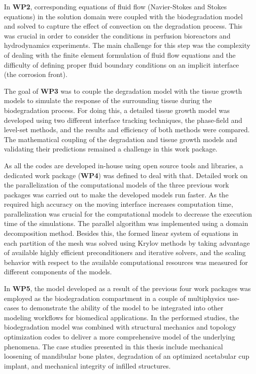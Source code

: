 In \textbf{WP2}, corresponding equations of fluid flow (Navier-Stokes and Stokes equations) in the solution domain were coupled with the biodegradation model and solved to capture the effect of convection on the degradation process. This was crucial in order to consider the conditions in perfusion bioreactors and hydrodynamics experiments. The main challenge for this step was the complexity of dealing with the finite element formulation of fluid flow equations and the difficulty of defining proper fluid boundary conditions on an implicit interface (the corrosion front).

The goal of \textbf{WP3} was to couple the degradation model with the tissue growth models to simulate the response of the surrounding tissue during the biodegradation process. For doing this, a detailed tissue growth model was developed using two different interface tracking techniques, the phase-field and level-set methods, and the results and efficiency of both methods were compared. The mathematical coupling of the degradation and tissue growth models and validating their predictions remained a challenge in this work package.

As all the codes are developed in-house using open source tools and libraries, a dedicated work package (\textbf{WP4}) was defined to deal with that. Detailed work on the parallelization of the computational models of the three previous work packages was carried out to make the developed models run faster. As the required high accuracy on the moving interface increases computation time, parallelization was crucial for the computational models to decrease the execution time of the simulations. The parallel algorithm was implemented using a domain decomposition method. Besides this, the formed linear system of equations in each partition of the mesh was solved using Krylov methods by taking advantage of available highly efficient preconditioners and iterative solvers, and the scaling behavior with respect to the available computational resources was measured for different components of the models.

In \textbf{WP5}, the model developed as a result of the previous four work packages was employed as the biodegradation compartment in a couple of multiphysics use-cases to demonstrate the ability of the model to be integrated into other modeling workflows for biomedical applications. In the performed studies, the biodegradation model was combined with structural mechanics and topology optimization codes to deliver a more comprehensive model of the underlying phenomena. The case studies presented in this thesis include mechanical loosening of mandibular bone plates, degradation of an optimized acetabular cup implant, and mechanical integrity of infilled structures. 



